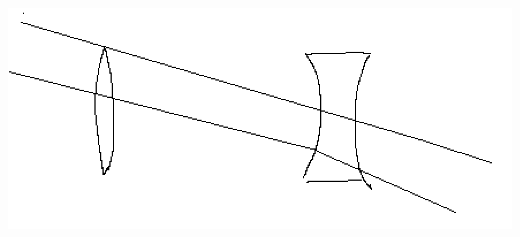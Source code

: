 \documentclass[12pt,twoside, a4paper, twocolumn]{article}
\begin{document}
\begin{adjustbox}{scale=0.70}
  \includegraphics{Graph3.png}
\end{adjustbox}
\end{document}
